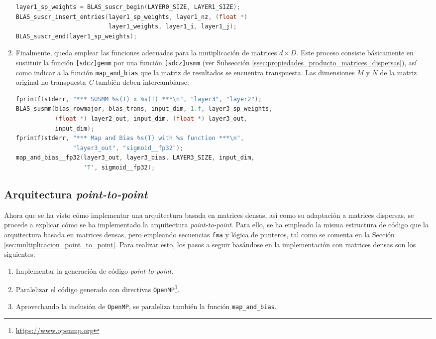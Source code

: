 \begin{enumerate}
\begin{lstlisting}[language=C]
layer1_sp_weights = BLAS_suscr_begin(LAYER0_SIZE, LAYER1_SIZE);
BLAS_suscr_insert_entries(layer1_sp_weights, layer1_nz, (float *)
                          layer1_weights, layer1_i, layer1_j);
BLAS_suscr_end(layer1_sp_weights);
\end{lstlisting}

    \item Finalmente, queda emplear las funciones adecuadas para la mutiplicación de matrices $d\times D$. Este proceso consiste básicamente en sustituir la función \texttt{[sdcz]gemm} por una función \texttt{[sdcz]usmm} (ver Subsección \ref{ssec:propiedades_producto_matrices_dispersas}), así como indicar a la función \texttt{map\_and\_bias} que la matriz de resultados se encuentra transpuesta. Las dimensiones $M$ y $N$ de la matriz original no transpuesta \textit{C} también deben intercambiarse:\medskip
\begin{lstlisting}[language=C]
fprintf(stderr, "*** SUSMM %s(T) x %s(T) ***\n", "layer3", "layer2");
BLAS_susmm(blas_rowmajor, blas_trans, input_dim, 1.f, layer3_sp_weights,
           (float *) layer2_out, input_dim, (float *) layer3_out,
           input_dim);
fprintf(stderr, "*** Map and Bias %s(T) with %s function ***\n",
                "layer3_out", "sigmoid__fp32");
map_and_bias__fp32(layer3_out, layer3_bias, LAYER3_SIZE, input_dim,
                   'T', sigmoid__fp32);
\end{lstlisting}
\end{enumerate}

\subsection{Arquitectura \textit{point-to-point}}
\label{ssec:gdin_arquitectura_point_to_point}
Ahora que se ha visto cómo implementar una arquitectura basada en matrices densas, así como su adaptación a matrices dispersas, se procede a explicar cómo se ha implementado la arquitectura \textit{point-to-point}. Para ello, se ha empleado la misma estructura de código que la arquitectura basada en matrices densas, pero empleando secuencias \texttt{\acrshort{fma}} y lógica de punteros, tal como se comenta en la Sección \ref{sec:multiplicacion_point_to_point}. Para realizar esto, los pasos a seguir basándose en la implementación con matrices densas son los siguientes:

\begin{enumerate}
    \item Implementar la generación de código \textit{point-to-point}.
    \item Paralelizar el código generado con directivas \texttt{OpenMP}\footnote{\url{https://www.openmp.org}}.
    \item Aprovechando la inclusión de \texttt{OpenMP}, se paraleliza también la función \texttt{map\_and\_bias}.
\end{enumerate}

